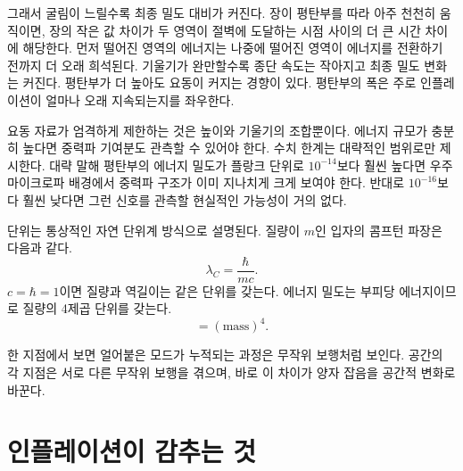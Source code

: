 그래서 굴림이 느릴수록 최종 밀도 대비가 커진다. 장이 평탄부를 따라 아주 천천히 움직이면, 장의 작은 값 차이가 두 영역이 절벽에 도달하는 시점 사이의 더 큰 시간 차이에 해당한다. 먼저 떨어진 영역의 에너지는 나중에 떨어진 영역이 에너지를 전환하기 전까지 더 오래 희석된다. 기울기가 완만할수록 종단 속도는 작아지고 최종 밀도 변화는 커진다. 평탄부가 더 높아도 요동이 커지는 경향이 있다. 평탄부의 폭은 주로 인플레이션이 얼마나 오래 지속되는지를 좌우한다.

요동 자료가 엄격하게 제한하는 것은 높이와 기울기의 조합뿐이다. 에너지 규모가 충분히 높다면 중력파 기여분도 관측할 수 있어야 한다. 수치 한계는 대략적인 범위로만 제시한다. 대략 말해 평탄부의 에너지 밀도가 플랑크 단위로 \(10^{-14}\)보다 훨씬 높다면 우주 마이크로파 배경에서 중력파 구조가 이미 지나치게 크게 보여야 한다. 반대로 \(10^{-16}\)보다 훨씬 낮다면 그런 신호를 관측할 현실적인 가능성이 거의 없다. 

단위는 통상적인 자연 단위계 방식으로 설명된다. 질량이 \(m\)인 입자의 콤프턴 파장은 다음과 같다.
\begin{equation}
\lambda_C=\frac{\hbar}{mc}.
\end{equation}
\(c=\hbar=1\)이면 질량과 역길이는 같은 단위를 갖는다. 에너지 밀도는 부피당 에너지이므로 질량의 4제곱 단위를 갖는다.
\begin{equation}
[\rho]=(\mathrm{mass})^4.
\end{equation}

한 지점에서 보면 얼어붙은 모드가 누적되는 과정은 무작위 보행처럼 보인다. 공간의 각 지점은 서로 다른 무작위 보행을 겪으며, 바로 이 차이가 양자 잡음을 공간적 변화로 바꾼다.

\begin{classroomqa}
\end{classroomqa}

\section{인플레이션이 감추는 것}

